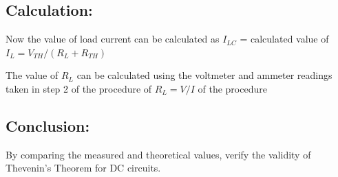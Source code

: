 \subsection*{Calculation:}

Now the value of load current can be calculated as $I_{LC}$ = calculated value of $I_L  =  V_{TH} / (R_L + R_{TH})$

\vspace{0.25cm}

\noindent The value of $R_L$ can be calculated using the voltmeter and ammeter readings taken in step 2 of the procedure of $R_L = V/I$ of the procedure


\subsection*{Conclusion:}
By comparing the measured and theoretical values, verify the validity of Thevenin’s Theorem for DC circuits.

\newpage 